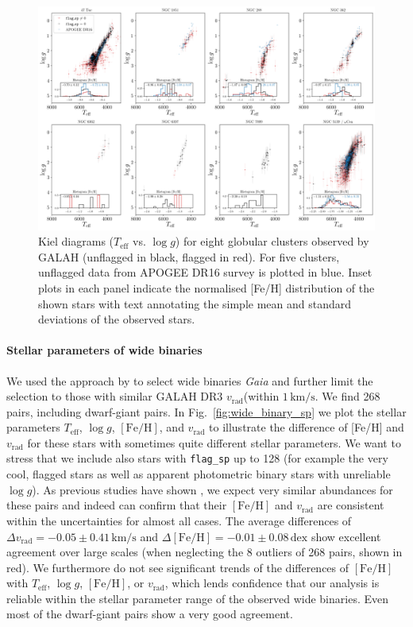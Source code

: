 \documentclass[fleqn,usenatbib,useAMS]{mnras}
\newcommand{\Teff}{$T_\mathrm{eff}$\xspace}
\newcommand{\logg}{$\log g$\xspace}
\newcommand{\feh}{$\mathrm{[Fe/H]}$\xspace}
\newcommand{\vrad}{$v_\mathrm{rad}$\xspace}
\newcommand{\Gaia}{\textit{Gaia}\xspace}
\begin{document}
\begin{figure}
\centering
\includegraphics[width=\textwidth]{figures/gc_kiel_diagrams.png}
\caption{Kiel diagrams (\Teff vs. \logg) for eight globular clusters observed by GALAH (unflagged in black, flagged in red). For five clusters, unflagged data from APOGEE DR16 survey \citep{SDSSDR16} is plotted in blue. Inset plots in each panel indicate the normalised [Fe/H] distribution of the shown stars with text annotating the simple mean and standard deviations of the observed stars.}
\label{fig:gc_feh}
\end{figure}

\paragraph*{Stellar parameters of wide binaries}

We used the approach by \citet{ElBadry2018c} to select wide binaries \Gaia and further limit the selection to those with similar GALAH DR3 \vrad (within $1\,\mathrm{km/s}$. We find 268 pairs, including dwarf-giant pairs. In Fig.~\ref{fig:wide_binary_sp} we plot the stellar parameters \Teff, \logg, \feh, and \vrad to illustrate the difference of [Fe/H] and \vrad for these stars with sometimes quite different stellar parameters. We want to stress that we include also stars with \texttt{flag\_sp} up to 128 (for example the very cool, flagged stars as well as apparent photometric binary stars with unreliable \logg). As previous studies have shown \citep{ElBadry2018b, ElBadry2018c}, we expect very similar abundances for these pairs and indeed can confirm that their \feh and \vrad are consistent within the uncertainties for almost all cases. The average differences of $\Delta v_\text{rad} = -0.05 \pm 0.41\,\mathrm{km/s}$ and $\Delta \mathrm{[Fe/H]} = -0.01 \pm 0.08\,\mathrm{dex}$ show excellent agreement over large scales (when neglecting the 8 outliers of 268 pairs, shown in red). We furthermore do not see significant trends of the differences of \feh with \Teff, \logg, \feh, or \vrad, which lends confidence that our analysis is reliable within the stellar parameter range of the observed wide binaries. Even most of the dwarf-giant pairs show a very good agreement.
\end{document}

